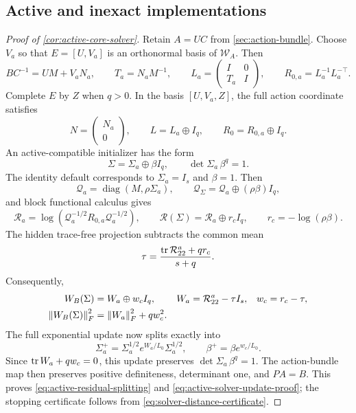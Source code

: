 \subsection{Active and inexact implementations}

\begin{proof}[Proof of \cref{cor:active-core-solver}]
Retain \(A=UC\) from \cref{sec:action-bundle}.  Choose \(V_a\) so that
\(E=[U,V_a]\) is an orthonormal basis of \(\mathcal W_A\).  Then
\[
  BC^{-1}=UM+V_aN_a,\qquad
  T_a=N_aM^{-1},\qquad
  L_a=\begin{pmatrix}I&0\\T_a&I\end{pmatrix},
  \qquad
  R_{0,a}=L_a^{-1}L_a^{-\top}.
\]
Complete \(E\) by \(Z\) when \(q>0\).  In the basis \([U,V_a,Z]\), the
full action coordinate satisfies
\[
  N=\begin{pmatrix}N_a\\0\end{pmatrix},
  \qquad
  L=L_a\oplus I_q,
  \qquad
  R_0=R_{0,a}\oplus I_q.
\]
An active-compatible initializer has the form
\[
  \Sigma=\Sigma_a\oplus\beta I_q,
  \qquad
  \det\Sigma_a\,\beta^q=1.
\]
The identity default corresponds to \(\Sigma_a=I_s\) and \(\beta=1\).
Then
\[
  \mathcal Q_a=\operatorname{diag}(M,\rho\Sigma_a),
  \qquad
  \mathcal Q_\Sigma
  =\mathcal Q_a\oplus(\rho\beta)I_q,
\]
and block functional calculus gives
\[
  \mathcal R_a
  =\log(\mathcal Q_a^{-1/2}R_{0,a}\mathcal Q_a^{-1/2}),
  \qquad
  \mathcal R(\Sigma)
  =\mathcal R_a\oplus r_cI_q,
  \qquad
  r_c=-\log(\rho\beta).
\]
The hidden trace-free projection subtracts the common mean
\[
  \tau=\frac{\operatorname{tr}\mathcal R_{22}^a+qr_c}{s+q}.
\]
Consequently,
\begin{equation}
  \begin{aligned}
    W_B(\Sigma)&=W_a\oplus w_cI_q,
    &W_a&=\mathcal R_{22}^a-\tau I_s,
    &w_c&=r_c-\tau,\\
    \left\lVert W_B(\Sigma)\right\rVert_F^2&=\left\lVert W_a\right\rVert_F^2+qw_c^2.
  \end{aligned}
\label{eq:active-residual-splitting}
\end{equation}
The full exponential update now splits exactly into
\begin{equation}
  \Sigma_a^+
  =\Sigma_a^{1/2}e^{W_a/L_0}\Sigma_a^{1/2},
  \qquad
  \beta^+=\beta e^{w_c/L_0}.
\label{eq:active-solver-update-proof}
\end{equation}
Since \(\operatorname{tr} W_a+qw_c=0\), this update preserves
\(\det\Sigma_a\,\beta^q=1\).  The action-bundle map then preserves
positive definiteness, determinant one, and \(PA=B\).  This proves
\eqref{eq:active-residual-splitting} and
\eqref{eq:active-solver-update-proof}; the
stopping certificate follows from
\cref{eq:solver-distance-certificate}.


\end{proof}
